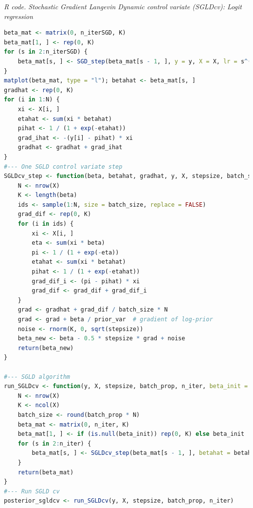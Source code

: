 \begin{enumerate}[leftmargin=*]
\begin{tcolorbox}[enhanced,width=4.67in,center upper,
	fontupper=\large\bfseries,drop shadow southwest,sharp corners]
	\textit{R code. Stochastic Gradient Langevin Dynamic control variate (SGLDcv): Logit regression}
	\begin{VF}
		\begin{lstlisting}[language=R]
beta_mat <- matrix(0, n_iterSGD, K)
beta_mat[1, ] <- rep(0, K)
for (s in 2:n_iterSGD) {
	beta_mat[s, ] <- SGD_step(beta_mat[s - 1, ], y = y, X = X, lr = s^(-kappa), batch_size = batch_size, prior_var = prior_var)
}
matplot(beta_mat, type = "l"); betahat <- beta_mat[s, ]
gradhat <- rep(0, K)
for (i in 1:N) {
	xi <- X[i, ]
	etahat <- sum(xi * betahat)
	pihat <- 1 / (1 + exp(-etahat))
	grad_ihat <- -(y[i] - pihat) * xi
	gradhat <- gradhat + grad_ihat
}
#--- One SGLD control variate step
SGLDcv_step <- function(beta, betahat, gradhat, y, X, stepsize, batch_size, prior_var = 10) {
	N <- nrow(X)
	K <- length(beta)
	ids <- sample(1:N, size = batch_size, replace = FALSE)
	grad_dif <- rep(0, K)
	for (i in ids) {
		xi <- X[i, ]
		eta <- sum(xi * beta)
		pi <- 1 / (1 + exp(-eta))
		etahat <- sum(xi * betahat)
		pihat <- 1 / (1 + exp(-etahat))
		grad_dif_i <- (pi - pihat) * xi
		grad_dif <- grad_dif + grad_dif_i
	}
	grad <- gradhat + grad_dif / batch_size * N
	grad <- grad + beta / prior_var  # gradient of log-prior
	noise <- rnorm(K, 0, sqrt(stepsize))
	beta_new <- beta - 0.5 * stepsize * grad + noise
	return(beta_new)
}

#--- SGLD algorithm
run_SGLDcv <- function(y, X, stepsize, batch_prop, n_iter, beta_init = NULL, prior_var = prior_var) {
	N <- nrow(X)
	K <- ncol(X)
	batch_size <- round(batch_prop * N)
	beta_mat <- matrix(0, n_iter, K)
	beta_mat[1, ] <- if (is.null(beta_init)) rep(0, K) else beta_init
	for (s in 2:n_iter) {
		beta_mat[s, ] <- SGLDcv_step(beta_mat[s - 1, ], betahat = betahat, gradhat = gradhat, y, X, stepsize, batch_size)
	}
	return(beta_mat)
}
#--- Run SGLD cv
posterior_sgldcv <- run_SGLDcv(y, X, stepsize, batch_prop, n_iter)
\end{lstlisting}
	\end{VF}
\end{tcolorbox}


\end{enumerate}
